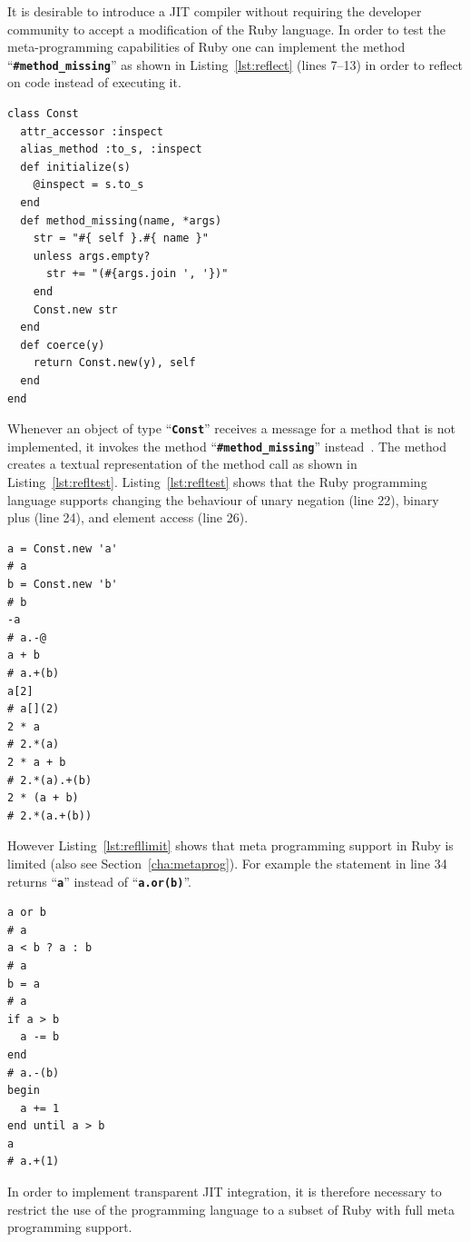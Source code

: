 \documentclass[12pt,a4paper,oneside,openright]{book}
\newcommand{\Eg}{For example }
\newcommand{\sct}[1]{Section~\ref{cha:#1}}
\newcommand{\lst}[1]{Listing~\ref{lst:#1}}
\newcommand{\code}[1]{``\texttt{\textbf{\textcolor{codegray}{\small{#1}}}}''}
\begin{document}
\begin{CJK}{UTF8}{}
It is desirable to introduce a \ac{JIT} compiler without requiring the developer community to accept a modification of the Ruby language. In order to test the meta-programming capabilities of Ruby one can implement the method \code{\#method\_missing} as shown in \lst{reflect} (lines 7--13) in order to reflect on code instead of executing it.
\lstset{language=Ruby,frame=single,numbers=left}
\begin{lstlisting}[float=htbp,caption={Reflection using missing methods},escapechar=\$,label=lst:reflect,name=reflect]
class Const
  attr_accessor :inspect
  alias_method :to_s, :inspect
  def initialize(s)
    @inspect = s.to_s
  end
  def method_missing(name, *args)
    str = "#{ self }.#{ name }"
    unless args.empty?
      str += "(#{args.join ', '})"
    end
    Const.new str
  end
  def coerce(y)
    return Const.new(y), self
  end
end
\end{lstlisting}
Whenever an object of type \code{Const} receives a message for a method that is not implemented, it invokes the method \code{\#method\_missing} instead~\citep{RefWorks:541}. The method creates a textual representation of the method call as shown in \lst{refltest}. \lst{refltest} shows that the Ruby programming language supports changing the behaviour of unary negation (line 22), binary plus (line 24), and element access (line 26).
\lstset{language=Ruby,frame=single,numbers=left}
\begin{lstlisting}[float=htbp,caption={Example applying reflection to simple operations},escapechar=\$,label=lst:refltest,name=reflect]
a = Const.new 'a'
# a
b = Const.new 'b'
# b
-a
# a.-@
a + b
# a.+(b)
a[2]
# a[](2)
2 * a
# 2.*(a)
2 * a + b
# 2.*(a).+(b)
2 * (a + b)
# 2.*(a.+(b))
\end{lstlisting}

However \lst{refllimit} shows that meta programming support in Ruby is limited (also see \sct{metaprog}). \Eg the statement in line 34 returns \code{a} instead of \code{a.or(b)}.
\lstset{language=Ruby,frame=single,numbers=left}
\begin{lstlisting}[float=htbp,caption={Limitations of reflection in Ruby},escapechar=\$,label=lst:refllimit,name=reflect]
a or b
# a
a < b ? a : b
# a
b = a
# a
if a > b
  a -= b
end
# a.-(b)
begin
  a += 1
end until a > b
a
# a.+(1)
\end{lstlisting}
In order to implement transparent \ac{JIT} integration, it is therefore necessary to restrict the use of the programming language to a subset of Ruby with full meta programming support.


\end{CJK}
\end{document}
